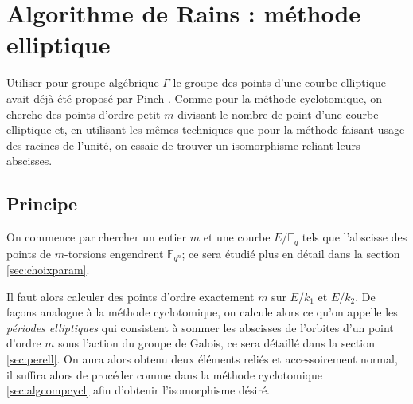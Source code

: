 \documentclass[a4paper]{article} %
\numberwithin{section}{part}
\numberwithin{equation}{section}
\newcommand\GF[1]{\mathbb{F}_{#1}}
\begin{document}
\section{Algorithme de Rains : méthode elliptique}
\label{sec:algell}
Utiliser pour groupe algébrique $\Gamma$ le groupe des points d'une courbe
elliptique avait déjà été proposé par Pinch \cite{Pin}. Comme pour la méthode
cyclotomique, on cherche des points d'ordre petit $m$ divisant le nombre de
point d'une courbe elliptique et, en utilisant les mêmes techniques que pour la
méthode faisant usage des racines de l'unité, on essaie de trouver un
isomorphisme reliant leurs abscisses.
\subsection{Principe}
On commence par chercher un entier $m$ et une courbe $E/\GF{q}$ tels que
l'abscisse des points de $m$-torsions engendrent $\GF{q^n}$; ce sera
étudié plus en détail dans la section \ref{sec:choixparam}.\par
Il faut alors calculer des points d'ordre exactement $m$ sur $E/k_1$ et $E/k_2$.
De façons analogue à la méthode cyclotomique, on calcule alors ce qu'on appelle 
les \emph{périodes elliptiques} qui consistent à sommer les abscisses de 
l'orbites d'un point d'ordre $m$ sous l'action du groupe de Galois, ce sera 
détaillé dans la section \ref{sec:perell}. On aura alors obtenu deux éléments 
reliés et accessoirement normal, il suffira alors de procéder comme dans la 
méthode cyclotomique \ref{sec:algcompcycl} afin d'obtenir l'isomorphisme désiré.
\end{document}
